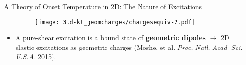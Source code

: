 \begin{frame}{A Theory of Onset Temperature in 2D: The Nature of Excitations}
\begin{itemize}
\begin{figure}
\centering\texttt{[image: 3.d-kt\_geomcharges/chargesequiv-2.pdf]}\hspace{3pt}
\vspace{5pt}
\end{figure}

\item<4-> A pure-shear excitation is a bound state of \textbf{geometric dipoles} \pause $ \to$ 2D elastic excitations as geometric charges (Moshe, et al. \textit{Proc. Natl. Acad. Sci. U.S.A.} 2015).
\end{itemize}

\end{frame}


